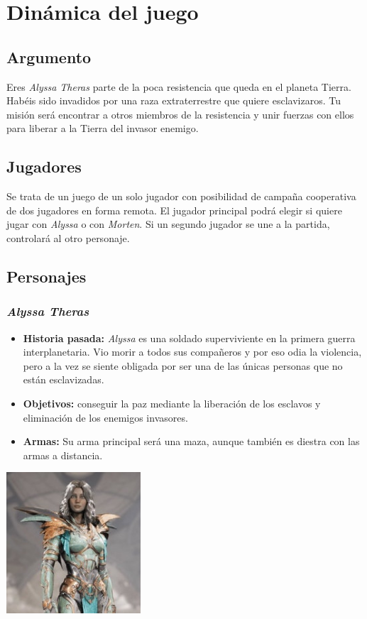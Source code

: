 \documentclass[11pt, twoside]{article}
\begin{document}
\pagestyle{insection}
\section{Dinámica del juego}


\subsection{Argumento}
Eres \textit{Alyssa Theras} parte de la poca resistencia que queda en el planeta Tierra. Habéis sido invadidos por una raza extraterrestre que quiere esclavizaros. Tu misión será encontrar a otros miembros de la resistencia y unir fuerzas con ellos para liberar a la Tierra del invasor enemigo. 

\subsection{Jugadores}
Se trata de un juego de un solo jugador con posibilidad de campaña cooperativa de dos jugadores en forma remota. El jugador principal podrá elegir si quiere jugar con \textit{Alyssa} o con \textit{Morten}. Si un segundo jugador se une a la partida, controlará al otro personaje.

\pagestyle{insection}
\subsection{Personajes}

\subsubsection{\textit{Alyssa Theras}}
\begin{itemize}
\item \textbf{Historia pasada:} \textit{Alyssa} es una soldado superviviente en la primera guerra interplanetaria. Vio morir a todos sus compañeros y por eso odia la violencia, pero a la vez se siente obligada por ser una de las únicas personas que no están esclavizadas. 
\item \textbf{Objetivos:} conseguir la paz mediante la liberación de los esclavos y eliminación de los enemigos invasores.
\item \textbf{Armas:} Su arma principal será una maza, aunque también es diestra con las armas a distancia. 
\end{itemize}

\begin{center}
\includegraphics[width=5cm]{./images/alyssa.jpg}
\end{center}
\end{document}
